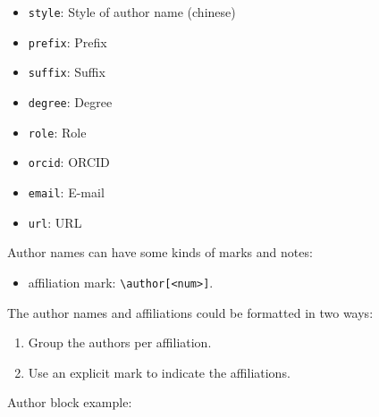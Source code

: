 \documentclass[
]{ceurart}
\begin{document}
\begin{itemize}
\item \verb|style|: Style of author name (chinese)
\item \verb|prefix|: Prefix
\item \verb|suffix|: Suffix
\item \verb|degree|: Degree
\item \verb|role|: Role
\item \verb|orcid|: ORCID
\item \verb|email|: E-mail
\item \verb|url|: URL
\end{itemize}

Author names can have some kinds of marks and notes:
\begin{itemize}
\item affiliation mark: \verb|\author[<num>]|.
\end{itemize}

The author names and affiliations could be formatted in two ways:
\begin{enumerate}
\item Group the authors per affiliation.
\item Use an explicit mark to indicate the affiliations.
\end{enumerate}

Author block example:




\end{document}
